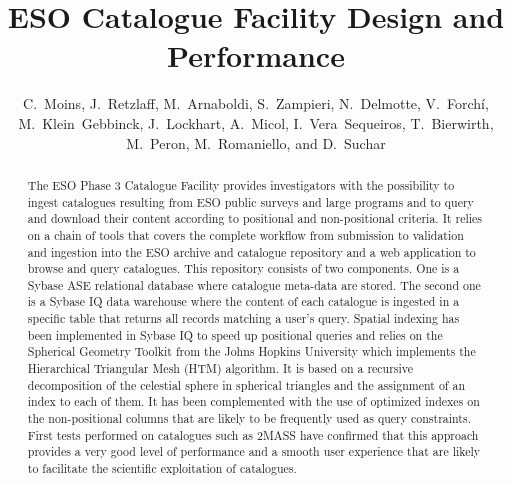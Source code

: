 
\resetcounters




\title{ESO Catalogue Facility Design and Performance}
\author{C.~Moins, J.~Retzlaff, M.~Arnaboldi, S.~Zampieri, N.~Delmotte, V.~Forch\'{i}, M.~Klein~Gebbinck, J.~Lockhart, A.~Micol, I.~Vera~Sequeiros, T.~Bierwirth, M.~Peron, M.~Romaniello, and D.~Suchar
}


\begin{abstract}
The ESO Phase 3 Catalogue Facility provides investigators with the possibility to ingest catalogues resulting from ESO public surveys and large programs and to query and download their content according to positional and non-positional criteria. It relies on a chain of tools that covers the complete workflow from  submission to validation and ingestion into the ESO archive and catalogue repository and a web application to browse and query catalogues.
This repository consists of two components. One is a Sybase ASE relational database where catalogue meta-data are stored. The second one is a Sybase IQ data warehouse where the content of each catalogue is ingested in a specific table that returns all records matching a user's query. Spatial indexing has been implemented in Sybase IQ to speed up positional queries and relies on the Spherical Geometry Toolkit from the Johns Hopkins University which implements the Hierarchical Triangular Mesh (HTM) algorithm. It is based on a recursive decomposition of the celestial sphere in spherical triangles and the assignment of an index to each of them. It has been complemented with the use of optimized indexes on the non-positional columns that are likely to be frequently used as query constraints.
First tests performed on catalogues such as 2MASS have confirmed that this approach provides a very good level of performance and a smooth user experience that are likely to facilitate the scientific exploitation of catalogues.
\end{abstract}

